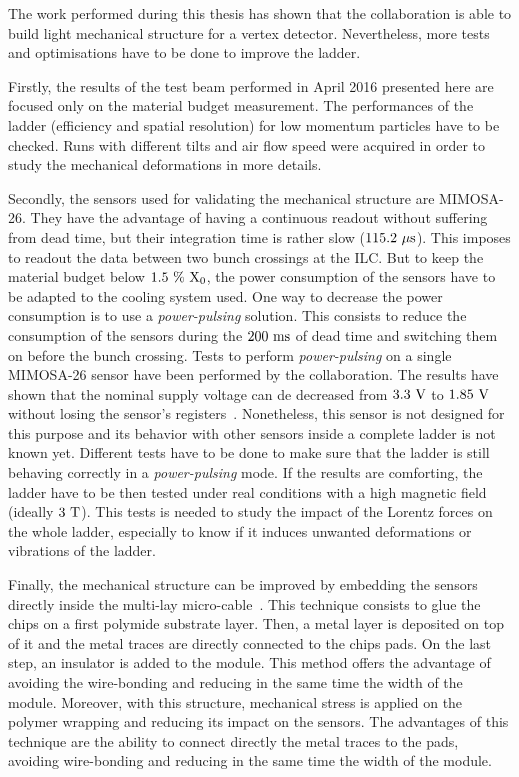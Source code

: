 
The work performed during this thesis has shown that the collaboration is able to build light mechanical structure for a vertex detector.
Nevertheless, more tests and optimisations have to be done to improve the ladder.

Firstly, the results of the test beam performed in April 2016 presented here are focused only on the material budget measurement.
The performances of the ladder (efficiency and spatial resolution) for low momentum particles have to be checked.
Runs with different tilts and air flow speed were acquired in order to study the mechanical deformations in more details.

Secondly, the sensors used for validating the mechanical structure are \gls{MIMOSA}-26.
They have the advantage of having a continuous readout without suffering from dead time, but their integration time is rather slow ($115.2~\rm{\mu s}$).
This imposes to readout the data between two bunch crossings at the \gls{ILC}.
But to keep the material budget below $1.5~\%~\rm{X_{0}}$, the power consumption of the sensors have to be adapted to the cooling system used.
One way to decrease the power consumption is to use a \textit{power-pulsing} solution.
This consists to reduce the consumption of the sensors during the $200~\rm{ms}$ of dead time and switching them on before the bunch crossing.
Tests to perform \textit{power-pulsing} on a single \gls{MIMOSA}-26 sensor have been performed by the collaboration.
The results have shown that the nominal supply voltage can de decreased from $3.3~\rm{V}$ to $1.85~\rm{V}$ without losing the sensor's registers~\cite{Kuprash2013}.
Nonetheless, this sensor is not designed for this purpose and its behavior with other sensors inside a complete ladder is not known yet.
Different tests have to be done to make sure that the ladder is still behaving correctly in a \textit{power-pulsing} mode.
If the results are comforting, the ladder have to be then tested under real conditions with a high magnetic field (ideally $3~\rm{T}$).
This tests is needed to study the impact of the Lorentz forces on the whole ladder, especially to know if it induces unwanted deformations or vibrations of the ladder.

Finally, the mechanical structure can be improved by embedding the sensors directly inside the multi-lay micro-cable~\cite{Baudot2012}.
This technique consists to glue the chips on a first polymide substrate layer.
Then, a metal layer is deposited on top of it and the metal traces are directly connected to the chips pads.
On the last step, an insulator is added to the module.
This method offers the advantage of avoiding the wire-bonding and reducing in the same time the width of the module.
Moreover, with this structure, mechanical stress is applied on the polymer wrapping and reducing its impact on the sensors.
The advantages of this technique are the ability to connect directly the metal traces to the pads, avoiding wire-bonding and reducing in the same time the width of the module.


